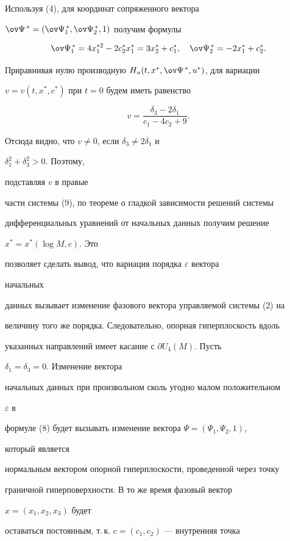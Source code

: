 Используя (4), для координат сопряженного вектора


$\ov\Psi^{\,*}=(\ov\Psi^{\,*}_1,\ov\Psi^{\,*}_2,1)$ получим формулы


$$


\ov\Psi^{\,*}_1=4x^{*2}_1-2c^*_2x^*_1=3x^*_2+c^*_1,\quad


\ov\Psi^{\,*}_2=-2x^*_1+c^*_2.


$$


Приравнивая нулю производную $H_u(t,x^*,\ov\Psi^{\,*},u^*)$, для вариации


$v=v(t,x^*,c^*)$ при $t=0$ будем иметь равенство


$$


v=\frac{\delta_3-2\delta_1}{c_1-4c_2+9}.


$$


Отсюда видно, что $v\ne 0$, если $\delta_3\ne 2\delta_1$ и


$\delta^2_1+\delta^2_3>0$. Поэтому,


подставляя $v$ в правые


части системы (9), по теореме о гладкой зависимости решений системы


дифференциальных уравнений от начальных данных получим решение


$x^*=x^*(\log M,c)$. Это


позволяет сделать вывод, что вариация порядка $\varepsilon$ вектора


начальных


данных вызывает изменение фазового вектора управляемой системы (2) на


величину того же порядка. Следовательно, опорная гиперплоскость вдоль


указанных направлений имеет касание с $\partial U_4(M)$. Пусть


$\delta_1=\delta_3=0$. Изменение вектора


начальных данных при произвольном сколь угодно малом положительном


$\varepsilon$ в


формуле (8) будет вызывать изменение вектора $\Psi=(\Psi_1,\Psi_2,1)$,


который является


нормальным вектором опорной гиперплоскости, проведенной через точку


граничной гиперповерхности. В то же время фазовый вектор


$x=(x_1,x_2,x_3)$ будет


оставаться постоянным, т.\,к. $c=(c_1,c_2)$ --- внутренняя точка



